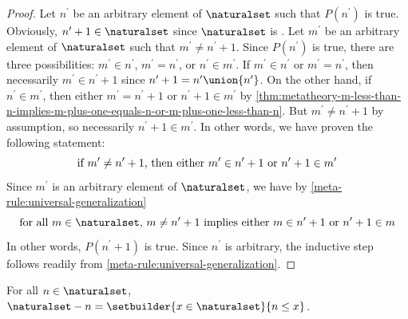 \begin{proof}
    \vspace{0.3cm}
    \noindent
    Let \( n^{\prime} \) be an arbitrary element of \( \naturalset \) such that \( P(n^{\prime}) \) is true.
    Obviously, \( n^{\prime} + 1 \in \naturalset \) since \( \naturalset \) is .
    Let \( m^{\prime} \) be an arbitrary element of \( \naturalset \) such that \( m^{\prime} \neq n^{\prime} + 1 \).
    Since \( P(n^{\prime}) \) is true, there are three possibilities: \( m^{\prime} \in n^{\prime} \), \( m^{\prime} = n^{\prime} \), or \( n^{\prime} \in m^{\prime} \).
    If \( m^{\prime} \in n^{\prime} \) or \( m^{\prime} = n^{\prime} \), then necessarily
    \( m^{\prime} \in n^{\prime} + 1 \) since \( n^{\prime} + 1 = n^{\prime} \union \mleft\{ n^{\prime} \mright\} \).
    On the other hand, if \( n^{\prime} \in m^{\prime} \), then either \( m^{\prime} = n^{\prime} + 1 \) or \( n^{\prime} + 1 \in  m^{\prime} \)
    by \cref{thm:metatheory-m-less-than-n-implies-m-plus-one-equals-n-or-m-plus-one-less-than-n}.
    But \( m^{\prime} \neq n^{\prime} + 1 \) by assumption, so necessarily \( n^{\prime} + 1 \in m^{\prime} \).
    In other words, we have proven the following statement:
    \begin{equation*}
        \text{if \( m^{\prime} \neq n^{\prime} + 1 \), then either \( m^{\prime} \in n^{\prime} + 1 \) or \( n^{\prime} + 1 \in m^{\prime} \)}
    \end{equation*}
    Since \( m^{\prime} \) is an arbitrary element of \( \naturalset \), we have by \cref{meta-rule:universal-generalization}
    \begin{equation*}
        \text{for all \( m \in \naturalset \), \( m \neq n^{\prime} + 1 \) implies either \( m \in n^{\prime} + 1 \) or \( n^{\prime} + 1 \in m \)}
    \end{equation*}
    In other words, \( P(n^{\prime} + 1) \) is true.
    Since \( n^{\prime} \) is arbitrary, the inductive step follows readily from \cref{meta-rule:universal-generalization}.
\end{proof}

\begin{thm}
     \label{thm:metatheory-N-minus-a-natural-number-is-the-set-of-all-natural-numbers-greater-than-or-equal-to-that-number}
    For all \( n \in \naturalset \), \( \naturalset - n = \setbuilder{x \in \naturalset}{n \leq x}  \).
\end{thm}

